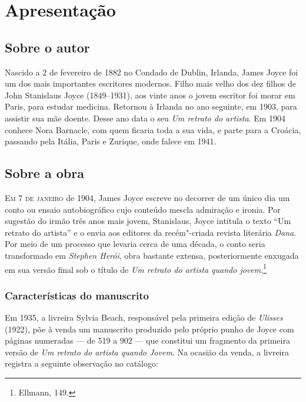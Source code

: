 \chapter[O manuscrito de Joyce, por José Roberto O'Shea]{Apresentação}

\section{Sobre o autor}

Nascido a 2 de fevereiro de 1882 no Condado de Dublin, Irlanda, James Joyce foi um dos mais importantes escritores modernos. Filho mais velho dos dez filhos de John Stanislaus Joyce (1849--1931), aos vinte anos o jovem escritor foi morar em Paris, para estudar medicina. Retornou à Irlanda no ano seguinte, em 1903, para assistir sua mãe doente. Desse ano data o seu \emph{Um retrato do artista}. 
Em 1904 conhece Nora Barnacle, com quem ficaria toda a sua vida, e parte para a Croácia, passando pela Itália, Paris e Zurique, onde falece em 1941.


\section{Sobre a obra}

\textsc{Em 7 de janeiro} de 1904, James Joyce escreve no decorrer de um único dia
um conto ou ensaio autobiográfico cujo conteúdo mescla admiração e
ironia.  Por sugestão do irmão três anos mais jovem, Stanislaus, Joyce
intitula o texto “Um retrato do artista” e o envia aos editores da
recém"-criada revista literária \textit{Dana}.  Por meio de um processo
que levaria  cerca de uma década, o conto seria transformado em
\textit{Stephen Herói}, obra bastante extensa, posteriormente enxugada
em sua versão final sob o título de \textit{Um retrato do artista
quando jovem}.\footnote{ Ellmann, 149.}		


\subsection*{Características do manuscrito}

Em 1935, a livreira Sylvia Beach, responsável pela primeira edição de
\textit{Ulisses} (1922), põe à venda um manuscrito produzido pelo
próprio punho de Joyce com páginas numeradas --- de 519 a 902 --- que
constitui um fragmento da primeira versão de \textit{Um retrato do
artista quando Jovem}.  Na ocasião da venda, a livreira registra a
seguinte observação no catálogo: 

